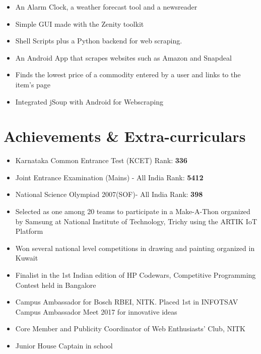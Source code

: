 \documentclass[12pt,a4paper,roman]{moderncv}        %
\begin{document}
\begin{itemize}[noitemsep]
\item An Alarm Clock, a weather forecast tool and a newsreader 
\item Simple GUI made  with the Zenity toolkit
\item Shell Scripts plus a Python backend for web scraping.
\end{itemize}

\begin{itemize}[noitemsep]
\item An Android App that scrapes websites such as Amazon and Snapdeal
\item Finds the lowest price of a commodity entered by a user and links to the item's page
\item Integrated jSoup with Android for Webscraping
\end{itemize}



\section{\small{Achievements \& Extra-curriculars}}

\begin{itemize}[noitemsep]

\item{Karnataka Common Entrance Test (KCET) Rank: \textbf{336}}
\item{Joint Entrance Examination (Mains) - All India Rank: \textbf{5412}} 
\item{National Science Olympiad 2007(SOF)-  All India Rank: \textbf{398}}   
\item{Selected as one among 20 teams to participate in a Make-A-Thon organized by Samsung at National Institute of Technology, Trichy using the ARTIK IoT Platform}
\item{Won several national level competitions in drawing and painting organized in Kuwait}
\item{Finalist in the 1st Indian edition of HP Codewars, Competitive Programming Contest held in Bangalore}
\item{Campus Ambassador for Bosch RBEI, NITK. Placed 1st in INFOTSAV Campus Ambassador Meet 2017 for innovative ideas}
\item{Core Member and Publicity Coordinator of Web Enthusiasts' Club, NITK}
\item{Junior House Captain in school}
\end{itemize}
\end{document}
